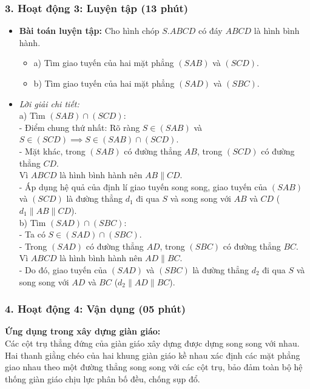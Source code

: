 \documentclass[12pt, a4paper]{article}
\begin{document}
\subsubsection*{3. Hoạt động 3: Luyện tập (13 phút)}
\begin{itemize}
    \item \textbf{Bài toán luyện tập:} Cho hình chóp $S.ABCD$ có đáy $ABCD$ là hình bình hành.
    \begin{itemize}
        \item a) Tìm giao tuyến của hai mặt phẳng $(SAB)$ và $(SCD)$.
        \item b) Tìm giao tuyến của hai mặt phẳng $(SAD)$ và $(SBC)$.
    \end{itemize}
    \item \textit{Lời giải chi tiết:}\\
    a) Tìm $(SAB) \cap (SCD)$:\\
    - Điểm chung thứ nhất: Rõ ràng $S \in (SAB)$ và $S \in (SCD) \implies S \in (SAB) \cap (SCD)$.\\
    - Mặt khác, trong $(SAB)$ có đường thẳng $AB$, trong $(SCD)$ có đường thẳng $CD$.\\
    Vì $ABCD$ là hình bình hành nên $AB \parallel CD$.\\
    - Áp dụng hệ quả của định lí giao tuyến song song, giao tuyến của $(SAB)$ và $(SCD)$ là đường thẳng $d_1$ đi qua $S$ và song song với $AB$ và $CD$ ($d_1 \parallel AB \parallel CD$).\\
    b) Tìm $(SAD) \cap (SBC)$:\\
    - Ta có $S \in (SAD) \cap (SBC)$.\\
    - Trong $(SAD)$ có đường thẳng $AD$, trong $(SBC)$ có đường thẳng $BC$.\\
    Vì $ABCD$ là hình bình hành nên $AD \parallel BC$.\\
    - Do đó, giao tuyến của $(SAD)$ và $(SBC)$ là đường thẳng $d_2$ đi qua $S$ và song song với $AD$ và $BC$ ($d_2 \parallel AD \parallel BC$).
\end{itemize}

\subsubsection*{4. Hoạt động 4: Vận dụng (05 phút)}
\textbf{Ứng dụng trong xây dựng giàn giáo:}\\
Các cột trụ thẳng đứng của giàn giáo xây dựng được dựng song song với nhau. Hai thanh giằng chéo của hai khung giàn giáo kề nhau xác định các mặt phẳng giao nhau theo một đường thẳng song song với các cột trụ, bảo đảm toàn bộ hệ thống giàn giáo chịu lực phân bố đều, chống sụp đổ.
\end{document}

